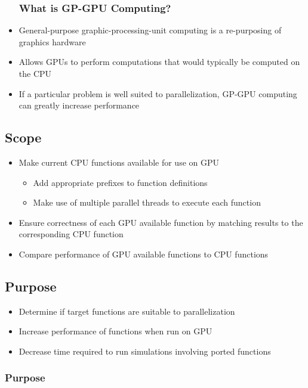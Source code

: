 \documentclass{beamer}
\begin{document}
\begin{frame}
\begin{itemize}
\frametitle{What is GP-GPU Computing?}
\item General-purpose graphic-processing-unit computing is a re-purposing of graphics hardware
\item Allows GPUs  to perform computations that would typically be computed on the CPU
\item If a particular problem is well suited to parallelization, GP-GPU computing can greatly increase performance
\end{itemize}
\end{frame}

\subsection{Scope}
\begin{frame}
\begin{itemize}
\frametitle{Scope}
\item Make current CPU functions available for use on GPU
\begin{itemize}
\item Add appropriate prefixes to function definitions
\item Make use of multiple parallel threads to execute each function
\end{itemize}
\item Ensure correctness of each GPU available function by matching results to the corresponding CPU function
\item Compare performance of GPU available functions to CPU functions
\end{itemize}
\end{frame}

\subsection{Purpose}
\begin{frame}
\begin{itemize}
\item Determine if target functions are suitable to parallelization 
\item Increase performance of functions when run on GPU
\item Decrease time required to run simulations involving ported functions
\end{itemize}
\frametitle{Purpose}
\end{frame}
\end{document}
